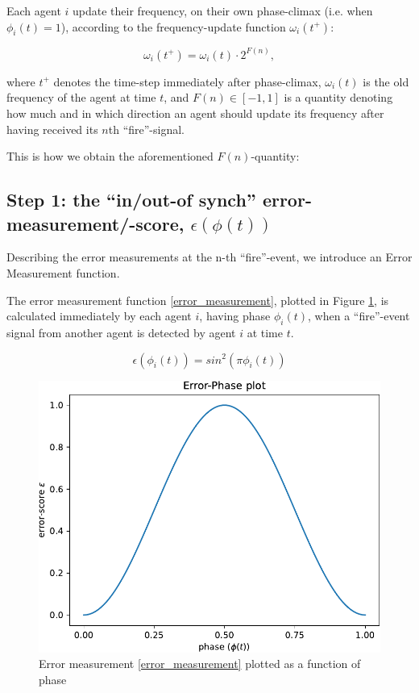 Each agent $i$ update their frequency, on their own phase-climax (i.e. when $\phi_i(t)=1$), according to the frequency-update function $\omega_i(t^+)$:

\begin{equation}
	\omega_i(t^+) = \omega_i(t) \cdot 2^{F(n)},
\end{equation}

where $t^+$ denotes the time-step immediately after phase-climax, $\omega_i(t)$ is the old frequency of the agent at time $t$, and $F(n) \in [-1,1]$ is a quantity denoting how much and in which direction an agent should update its frequency after having received its $n$th ``fire''-signal.

This is how we obtain the aforementioned $F(n)$-quantity:


\subsection{Step 1: the ``in/out-of synch'' error-measurement/-score, $\epsilon(\phi(t))$}

Describing the error measurements at the n-th ``fire''-event, we introduce an Error Measurement function.

The error measurement function \eqref{error_measurement}, plotted in Figure \ref{fig:error_measurement}, is calculated immediately by each agent $i$, having phase $\phi_i(t)$, when a ``fire''-event signal from another agent is detected by agent $i$ at time $t$.

\begin{equation}
\label{error_measurement}
	\epsilon(\phi_i(t)) = sin^2(\pi\phi_i(t))
\end{equation} \nl

\begin{figure}[ht!]
	\centering
	\includegraphics[width=0.65\linewidth]{Assets/DocSegments/Chapters/Baseline/Figures/Functions/PhaseErrorFunction.pdf}
	\caption[Plot of error-measurement function for K. Nymoen's frequency-adjustment]{Error measurement \eqref{error_measurement} plotted as a function of phase}
	\label{fig:error_measurement}
\end{figure}

